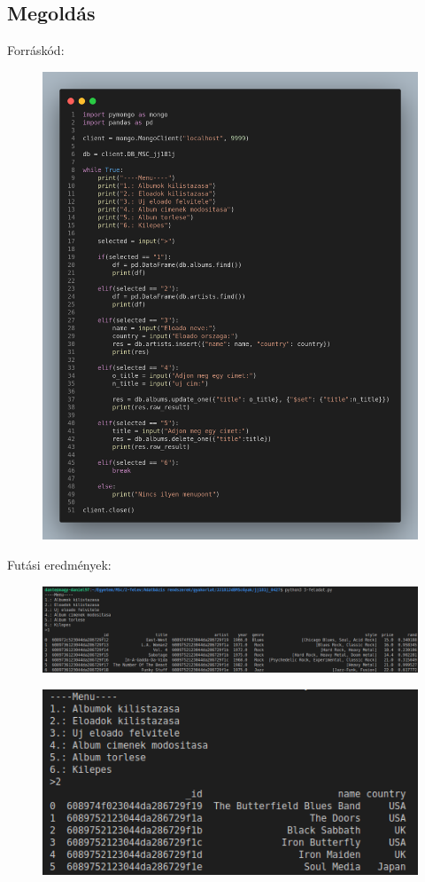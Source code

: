 \documentclass[a4paper, 12pt]{article}
\begin{document}
\subsection*{Megoldás}
{\large Forráskód:}
\begin{figure}[!hb]
	\centering
	\includegraphics[width = 17cm]{images/3_code.png}
	\label{fig:3_code}
\end{figure}	
\newpage
{\large Futási eredmények:}
\begin{figure}[!hb]
	\centering
	\includegraphics[scale = 0.4]{images/3_out1.png}
	\label{fig:3_out1}
\end{figure}
\begin{figure}[!hb]
	\centering
	\includegraphics[scale = 0.7]{images/3_out2.png}
	\label{fig:3_out2}
\end{figure}	
\end{document}

